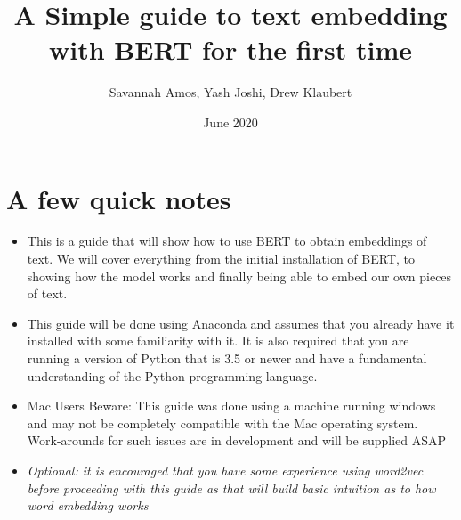 \documentclass{article}
\title{A Simple guide to text embedding with BERT for the first time}
\author{Savannah Amos, Yash Joshi, Drew Klaubert}
\date{June 2020}
\begin{document}
\maketitle

\section*{A few quick notes} 
\begin{itemize}
    \item This is a guide that will show how to use BERT to obtain embeddings of text.  We will cover everything from the initial installation of BERT, to showing how the model works and finally being able to embed our own pieces of text.
    \item This guide will be done using Anaconda and assumes that you already have it installed with some familiarity with it. It is also required that you are running a version of Python that is 3.5 or newer and have a fundamental understanding of the Python programming language.
    \item Mac Users Beware: This guide was done using a machine running windows and may not be completely compatible with the Mac operating system. Work-arounds for such issues are in development and will be supplied ASAP
    \item[]
    \textit{Optional: it is encouraged that you have some experience using word2vec before proceeding with this guide as that will build basic intuition as to how word embedding works}
\end{itemize}
\end{document}
